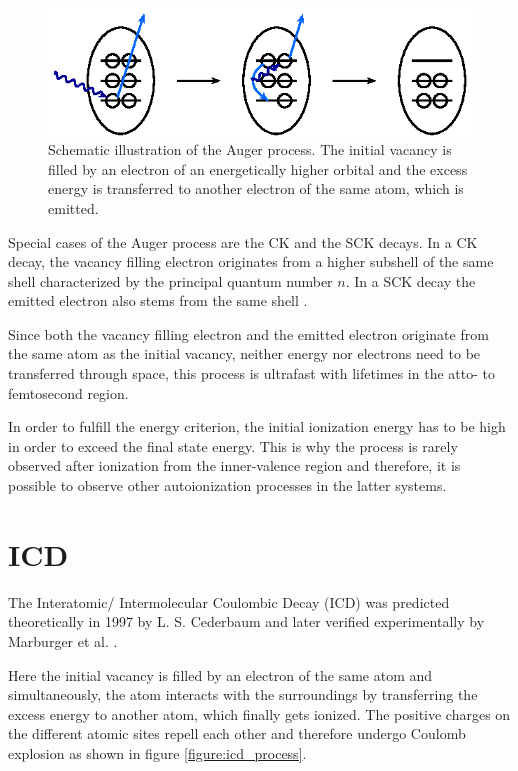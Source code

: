 \begin{figure}[h]
 \centering
 \includegraphics{pics/auger-pspic.eps}
 \caption{Schematic illustration of the Auger process. The initial vacancy is
          filled by an electron of an energetically higher orbital and the
          excess energy is transferred to another electron of the same atom,
          which is emitted.}
 \label{figure:auger_process}
\end{figure}

Special cases of the Auger process are the \ac{CK} and the \ac{SCK} decays.
In a \ac{CK} decay, the vacancy filling electron originates from a higher subshell
of the same shell characterized by the principal quantum number $n$. In a \ac{SCK}
decay the emitted electron also stems from the same shell \cite{Coster35}.

Since both the vacancy filling electron and the emitted electron originate
from the same atom as the initial vacancy, neither energy nor electrons need
to be transferred through space, this process is ultrafast with lifetimes
in the atto- to femtosecond region. \cite{}

In order to fulfill the energy criterion, the initial ionization energy has to
be high in order to exceed the final state energy. This is why
the process is rarely observed after
ionization from the inner-valence region and therefore, it is possible to
observe other autoionization processes in the latter systems.

\section{\acl{ICD}}
The Interatomic/ Intermolecular Coulombic Decay (ICD) was predicted
theoretically in 1997 by L. S. Cederbaum \cite{Cederbaum97}
and later verified experimentally by Marburger et al. \cite{Marburger03}.

Here the initial vacancy is filled by an electron of the same atom and simultaneously,
the atom interacts with the surroundings by
transferring the excess energy to another atom, which finally gets ionized. The
positive charges on the different atomic sites repell each other and therefore undergo
Coulomb explosion as shown in figure \ref{figure:icd_process}.

